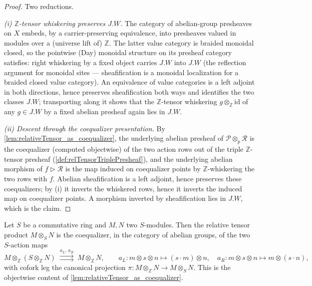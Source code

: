 \begin{proof}
  Two reductions.

  \emph{(i) \(\mathbb{Z}\)-tensor whiskering preserves \(J.W\).} The category
  of abelian-group presheaves on \(X\) embeds, by a carrier-preserving
  equivalence, into presheaves valued in modules over a (universe lift of)
  \(\mathbb{Z}\). The latter value category is braided monoidal closed, so the
  pointwise (Day) monoidal structure on its presheaf category satisfies: right
  whiskering by a fixed object carries \(J.W\) into \(J.W\) (the reflection
  argument for monoidal sites — sheafification is a monoidal localization for a
  braided closed value category). An equivalence of value categories is a left
  adjoint in both directions, hence preserves sheafification both ways and
  identifies the two classes \(J.W\); transporting along it shows that the
  \(\mathbb{Z}\)-tensor whiskering \(g \otimes_{\mathbb{Z}} \mathrm{id}\) of any
  \(g \in J.W\) by a fixed abelian presheaf again lies in \(J.W\).

  \emph{(ii) Descent through the coequalizer presentation.} By
  \cref{lem:relativeTensor_as_coequalizer}, the underlying abelian presheaf of
  \(\mathcal{P} \otimes_p \mathcal{R}\) is the coequalizer (computed objectwise)
  of the two action rows out of the triple \(\mathbb{Z}\)-tensor presheaf
  (\cref{def:relTensorTriplePresheaf}), and the underlying abelian morphism of
  \(f \rhd \mathcal{R}\) is the map induced on coequalizer points by
  \(\mathbb{Z}\)-whiskering the two rows with \(f\). Abelian sheafification is
  a left adjoint, hence preserves these coequalizers; by (i) it inverts the
  whiskered rows, hence it inverts the induced map on coequalizer points. A
  morphism inverted by sheafification lies in \(J.W\), which is the claim.
\end{proof}



\begin{lemma}
  \label{lem:relativeTensor_objectwise_coequalizer}
  Let \(S\) be a commutative ring and \(M, N\) two \(S\)-modules. Then the relative
  tensor product \(M \otimes_S N\) is the coequalizer, in the category of abelian
  groups, of the two \(S\)-action maps
  \[
    M \otimes_{\mathbb{Z}} (S \otimes_{\mathbb{Z}} N)
      \;\overset{a_L,\,a_R}{\rightrightarrows}\;
      M \otimes_{\mathbb{Z}} N,
    \qquad
    a_L : m \otimes s \otimes n \mapsto (s \cdot m) \otimes n,
    \quad
    a_R : m \otimes s \otimes n \mapsto m \otimes (s \cdot n),
  \]
  with cofork leg the canonical projection \(\pi : M \otimes_{\mathbb{Z}} N \to
  M \otimes_S N\). This is the objectwise content of
  \cref{lem:relativeTensor_as_coequalizer}.
\end{lemma}

